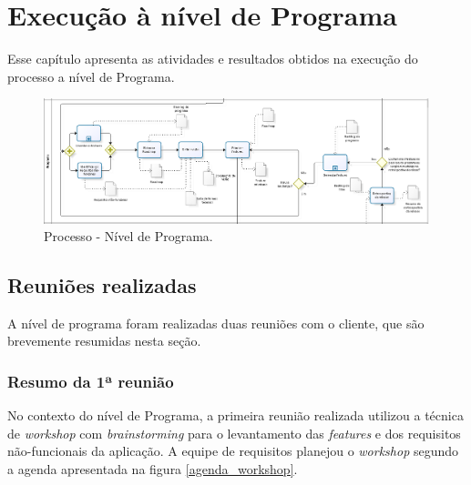 \chapter{Execução à nível de Programa}

  Esse capítulo apresenta as atividades e resultados obtidos na execução do processo a nível de Programa.
  
  \begin{figure}[!htbp]
    \centering
    \includegraphics[scale=0.33]{figuras/processo_programa}
    \caption[Processo - Nível de Programa]{Processo - Nível de Programa.}
    \label{processo_programa}
  \end{figure}
  \vspace{0in}
  
  \section{Reuniões realizadas}
    
    A nível de programa foram realizadas duas reuniões com o cliente, que são brevemente resumidas nesta seção.
    
    \subsection{Resumo da 1ª reunião}
    
      No contexto do nível de Programa, a primeira reunião realizada utilizou a técnica de \textit{workshop}
      com \textit{brainstorming} para o levantamento das \textit{features} e dos requisitos não-funcionais da aplicação.
      A equipe de requisitos planejou o \textit{workshop} segundo a agenda apresentada na figura \ref{agenda_workshop}.
      

